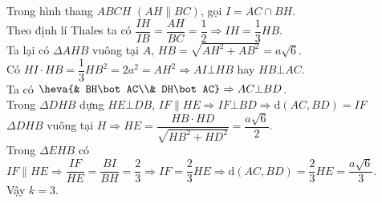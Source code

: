 \begin{ex}
{		Trong hình thang $ABCH$ $\left(AH\parallel BC\right)$, gọi $I=AC\cap BH$.\\
		Theo định lí Thales ta có $\dfrac{IH}{IB}=\dfrac{AH}{BC}=\dfrac{1}{2}\Rightarrow IH=\dfrac{1}{3}HB$.\\
		Ta lại có $\Delta AHB$ vuông tại $A$, $HB=\sqrt{AH^2+AB^2}=a\sqrt{6}$.\\
		Có $HI\cdot HB=\dfrac{1}{3}HB^2=2a^2=AH^2\Rightarrow AI\bot HB$ hay $HB\bot AC$.\\
		Ta có $\heva{& BH\bot AC\\& DH\bot AC}\Rightarrow AC\bot BD$.\\
		Trong $\Delta DHB$ dựng $HE\bot DB$, $IF\parallel HE\Rightarrow IF\bot BD\Rightarrow \mathrm{d}\left(AC,BD\right)=IF$\\
		$\Delta DHB$ vuông tại $H\Rightarrow HE=\dfrac{HB\cdot HD}{\sqrt{HB^2+HD^2}}=\dfrac{a\sqrt{6}}{2}$.\\
		Trong $\Delta EHB$ có\\
		$IF\parallel HE\Rightarrow \dfrac{IF}{HE}=\dfrac{BI}{BH}=\dfrac{2}{3}\Rightarrow IF=\dfrac{2}{3}HE\Rightarrow \mathrm{d}\left(AC,BD\right)=\dfrac{2}{3}HE=\dfrac{a\sqrt{6}}{3}$.\\
		Vậy $k=3$.}
\end{ex}
